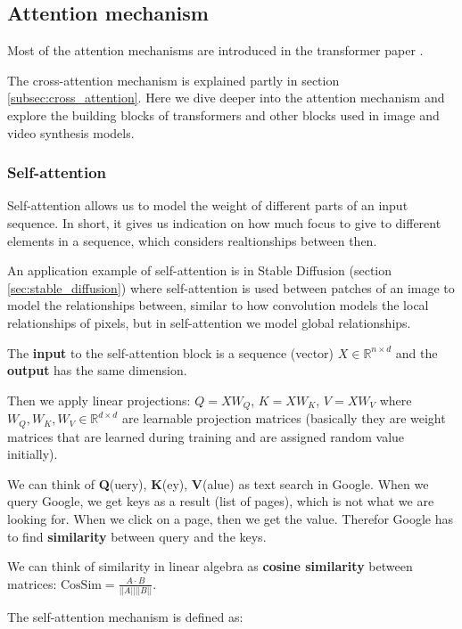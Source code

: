 \subsection{Attention mechanism}
\label{appendix:attention}

Most of the attention mechanisms are introduced in the transformer paper \cite{transformer}.

The cross-attention mechanism is explained partly in section \ref{subsec:cross_attention}. Here we dive deeper into the attention mechanism and explore the building blocks of transformers and other blocks used in image and video synthesis models.


\subsubsection{Self-attention}

Self-attention allows us to model the weight of different parts of an input sequence. In short, it gives us indication on how much focus to give to different elements in a sequence, which considers realtionships between then.

An application example of self-attention is in Stable Diffusion (section \ref{sec:stable_diffusion}) where self-attention is used between patches of an image to model the relationships between, similar to how convolution models the local relationships of pixels, but in self-attention we model global relationships.

The \textbf{input} to the self-attention block is a sequence (vector) $X \in \mathbb{R}^{n \times d}$ and the \textbf{output} has the same dimension.

Then we apply linear projections: $Q = XW_Q$, $K = XW_K$, $V = XW_V$ where $W_Q, W_K, W_V \in \mathbb{R}^{d \times d}$ are learnable projection matrices (basically they are weight matrices that are learned during training and are assigned random value initially).

We can think of \textbf{Q}(uery), \textbf{K}(ey), \textbf{V}(alue) as text search in Google. When we query Google, we get keys as a result (list of pages), which is not what we are looking for. When we click on a page, then we get the value. Therefor Google has to find \textbf{similarity} between query and the keys.

We can think of similarity in linear algebra as \textbf{cosine similarity} between matrices: $\text{CosSim} = \frac{A \cdot B}{||A|| ||B||}$.

The self-attention mechanism is defined as:

